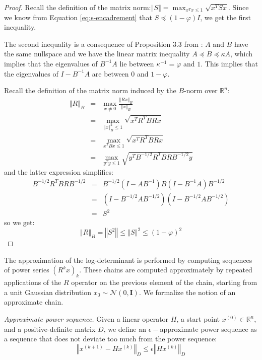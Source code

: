 \begin{proof} Recall the definition of the matrix norm:$\left\Vert S\right\Vert =\max_{x^{T}x\leq1}\sqrt{x^{T}Sx}$.
Since we know from Equation \ref{eq:s-encadrement} that $S\preceq\left(1-\varphi\right)I$,
we get the first inequality.

The second inequality is a consequence of Proposition 3.3 from \cite{Spielman2009a}:
$A$ and $B$ have the same nullspace and we have the linear matrix
inequality $A\preceq B\preceq\kappa A$, which implies that the eigenvalues
of $B^{-1}A$ lie between $\kappa^{-1}=\varphi$ and $1$. This implies
that the eigenvalues of $I-B^{-1}A$ are between $0$ and $1-\varphi$.

Recall the definition of the matrix norm induced by the $B$-norm
over $\mathbb{R}^{n}$: 
\begin{eqnarray*}
\left\Vert R\right\Vert _{B} & = & \max_{x\neq0}\frac{\left\Vert Rx\right\Vert _{B}}{\left\Vert x\right\Vert _{B}}\\
 & = & \max_{\left\Vert x\right\Vert _{B}^{2}\leq1}\sqrt{x^{T}R^{T}BRx}\\
 & = & \max_{x^{T}Bx\leq1}\sqrt{x^{T}R^{T}BRx}\\
 & = & \max_{y^{T}y\leq1}\sqrt{y^{T}B^{-1/2}R^{T}BRB^{-1/2}y}
\end{eqnarray*}
and the latter expression simplifies: 
\begin{eqnarray*}
B^{-1/2}R^{T}BRB^{-1/2} & = & B^{-1/2}\left(I-AB^{-1}\right)B\left(I-B^{-1}A\right)B^{-1/2}\\
 & = & \left(I-B^{-1/2}AB^{-1/2}\right)\left(I-B^{-1/2}AB^{-1/2}\right)\\
 & = & S^{2}
\end{eqnarray*}
so we get: 
\[
\left\Vert R\right\Vert _{B}=\left\Vert S^{2}\right\Vert \leq\left\Vert S\right\Vert ^{2}\leq\left(1-\varphi\right)^{2}
\]


\end{proof} 

The approximation of the log-determinant is performed by computing
sequences of power series $\left(R^{k}x\right)_{k}$. These chains
are computed approximately by repeated applications of the $R$ operator
on the previous element of the chain, starting from a unit Gaussian
distribution $x_{0}\sim\mathcal{N}\left(0,\mathbf{I}\right)$. We
formalize the notion of an approximate chain. 

\begin{definition} \emph{Approximate power sequence. }Given a linear
operator $H$, a start point $x^{\left(0\right)}\in\mathbb{R}^{n}$,
and a positive-definite matrix $D$, we define an $\epsilon-$approximate
power sequence as a sequence that does not deviate too much from the
power sequence: 
\[
\left\Vert x^{\left(k+1\right)}-Hx^{\left(k\right)}\right\Vert _{D}\leq\epsilon\left\Vert Hx^{\left(k\right)}\right\Vert _{D}
\]


\end{definition}


